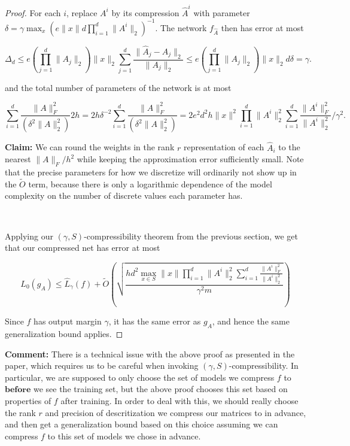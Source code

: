 \begin{proof}
For each $i$, replace $A^{i}$ by its compression $\hat{A}^{i}$ with parameter $\delta=\gamma \max_{x} (e\|x\|d\prod_{i=1}^d \|A^{i}\|_{2})^{-1}$. The network $f_{\hat{A}}$ then has error at most 

\begin{equation*}
\Delta_{d} \leq e \left(\prod_{j=1}^d \|A_j\|_2\right)\|x\|_2\sum_{j=1}^d \frac{\|\hat{A}_j-A_{j}\|_2}{\|A_j\|_2}\leq e \left(\prod_{j=1}^d \|A_j\|_2\right)\|x\|_2d\delta=\gamma.
\end{equation*}

and the total number of parameters of the network is at most 

\begin{equation*}
\sum_{i=1}^d \frac{\|A\|_F^2}{(\delta^2\|A\|_2^2)} 2h=2h \delta^{-2}\sum_{i=1}^d \frac{\|A\|_F^2}{(\delta^2\|A\|_2^2)} = 2e^{2}d^2 h\|x\|^2\prod_{i=1}^d \|A^{i}\|^{2}_{2}\sum_{i=1}^d \frac{\|A^{i}\|^{2}_{F}}{\|A^{i}\|^{2}_{2}}/\gamma^2.
\end{equation*}


\textbf{Claim:} We can round the weights in the rank $r$ representation of each $\hat{A}_{i}$ to the nearest $\|A\|_{F}/h^{2}$ while keeping the approximation error sufficiently small. Note that the precise parameters for how we discretize will ordinarily not show up in the $\tilde{O}$ term, because there is only a logarithmic dependence of the model complexity on the number of discrete values each parameter has. 


\ 

Applying our $(\gamma,S)$-compressibility theorem from the previous section, we get that our compressed net has error at most 

\begin{equation}
L_{0}(g_{A}) \leq \hat{L}_{\gamma}(f)+\tilde{O}\left(\sqrt{\frac{hd^2\max_{x\in S}\|x\| \prod_{i=1}^{d} \|A^i\|_2^2 \sum_{i=1}^d \frac{\|A^i\|_F^2}{\|A^i\|_2^2}}{\gamma^2m}}\right)
\end{equation}

Since $f$ has output margin $\gamma$, it has the same error as $g_{A}$, and hence the same generalization bound applies.

\end{proof}

\textbf{Comment:} There is a technical issue with the above proof as presented in the paper, which requires us to be careful when invoking $(\gamma,S)$-compressibility. In particular, we are supposed to only choose the set of models we compress $f$ to $\textbf{before}$ we see the training set, but the above proof chooses this set based on properties of $f$ after training. In order to deal with this, we should really choose the rank $r$ and precision of descritization we compress our matrices to in advance, and then get a generalization bound based on this choice assuming we can compress $f$ to this set of models we chose in advance. 

